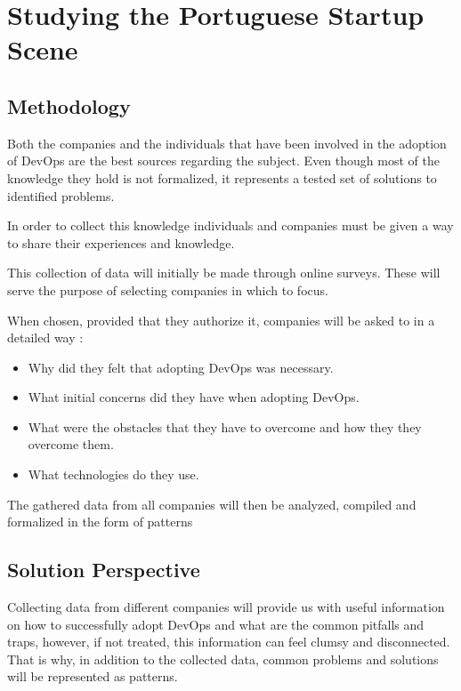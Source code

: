 \chapter{Studying the Portuguese Startup Scene} \label{chap:towardsdevops}


    \section{Methodology} \label{chap:towardsdevops:sec:methodology}

    Both the companies and the individuals that have been involved in the  adoption of DevOps are the best sources regarding the subject. Even though most of the knowledge they hold is not formalized, it represents a tested  set of solutions to identified problems.

    In order to collect this knowledge individuals and companies must be given a way to share their experiences and knowledge.

    This collection of data will initially be made through online surveys. These will serve the purpose of selecting companies in which to focus.

    When chosen, provided that they authorize it, companies will be asked to in a detailed way :
    \begin{itemize}
      \item{ Why did they felt that adopting DevOps was necessary. }
      \item{ What initial concerns did they have when adopting DevOps. }
      \item{ What were the obstacles that they have to overcome and how they they overcome them. }
      \item{ What technologies do they use. }
    \end{itemize}

    The gathered data from all companies will then be analyzed, compiled and formalized in the form of patterns

    \section{Solution Perspective} \label{chap:towardsdevops:sec:solutionperspective}

    Collecting data from different companies will provide us with useful information on how to successfully adopt DevOps and what are the common pitfalls and traps, however, if not treated, this information can feel clumsy and disconnected. That is why, in addition to the collected data, common problems and solutions will be represented as patterns.
